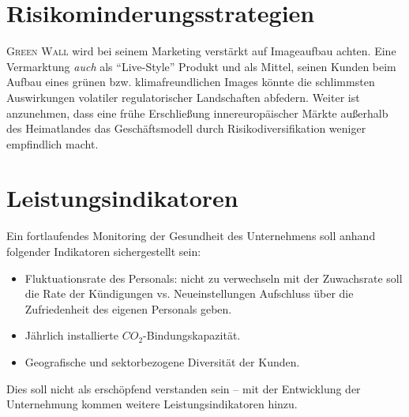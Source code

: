 \section{Risikominderungsstrategien}

\textsc{Green Wall} wird bei seinem Marketing verstärkt auf Imageaufbau achten.
Eine Vermarktung \textit{auch} als ``Live-Style'' Produkt und als Mittel, seinen Kunden beim Aufbau eines grünen bzw. klimafreundlichen Images könnte die schlimmsten Auswirkungen volatiler regulatorischer Landschaften abfedern.
Weiter ist anzunehmen, dass eine frühe Erschließung innereuropäischer Märkte außerhalb des Heimatlandes das Geschäftsmodell durch Risikodiversifikation weniger empfindlich macht.

\section{Leistungsindikatoren}

Ein fortlaufendes Monitoring der Gesundheit des Unternehmens soll anhand folgender Indikatoren sichergestellt sein:

\begin{itemize}
    \item Fluktuationsrate des Personals: nicht zu verwechseln mit der Zuwachsrate soll die Rate der Kündigungen vs. Neueinstellungen Aufschluss über die Zufriedenheit des eigenen Personals geben.
    \item Jährlich installierte \(CO_2\)-Bindungskapazität.
    \item Geografische und sektorbezogene Diversität der Kunden.
\end{itemize}

Dies soll nicht als erschöpfend verstanden sein -- mit der Entwicklung der Unternehmung kommen weitere Leistungsindikatoren hinzu.